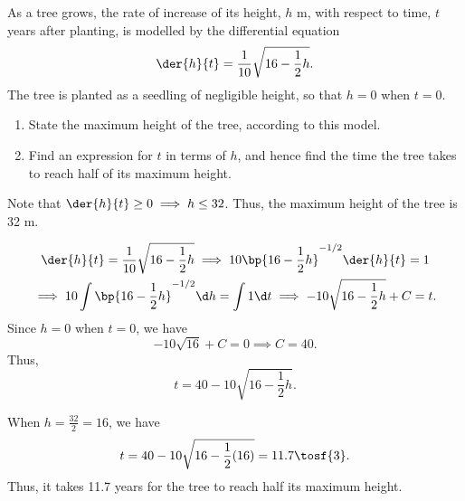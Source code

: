 \begin{problem}
    As a tree grows, the rate of increase of its height, $h$ m, with respect to time, $t$ years after planting, is modelled by the differential equation \[\der{h}{t} = \frac1{10} \sqrt{16 - \frac12 h}.\] The tree is planted as a seedling of negligible height, so that $h = 0$ when $t = 0$.
    \begin{enumerate}
        \item State the maximum height of the tree, according to this model.
        \item Find an expression for $t$ in terms of $h$, and hence find the time the tree takes to reach half of its maximum height.
    \end{enumerate}
\end{problem}
\begin{solution}
    \begin{ppart}
        Note that $\der{h}{t} \geq 0 \implies h \leq 32$. Thus, the maximum height of the tree is 32 m.
    \end{ppart}
    \begin{ppart}
        \begin{gather*}
            \der{h}{t} = \frac1{10} \sqrt{16 - \frac12 h} \implies 10 \bp{16 - \frac12 h}^{-1/2} \der{h}{t} = 1 \\
            \implies 10 \int \bp{16 - \frac12 h}^{-1/2} \d h = \int 1 \d t \implies -10 \sqrt{16 - \frac12 h} + C = t.
        \end{gather*}
        Since $h = 0$ when $t = 0$, we have \[-10\sqrt{16} + C = 0 \implies C = 40.\] Thus, \[t = 40-10\sqrt{16 - \frac12 h}.\]

        When $h = \frac{32}2 = 16$, we have \[t = 40 - 10\sqrt{16 - \frac12(16)} = 11.7 \tosf{3}.\] Thus, it takes 11.7 years for the tree to reach half its maximum height.
    \end{ppart}
\end{solution}

